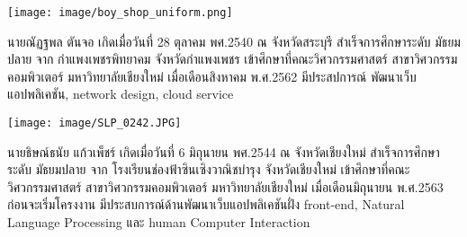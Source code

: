 \documentclass[semifinal]{cpecmu}
\author{นายณัฏฐพล ตันจอ}{Nattapon Tancho}{620610786}
\author{นายธิษณ์ธนัย แก้วเพ็ชร์}{Thidtanai Kaewphet}{630610741}
\begin{document}


\pagestyle{empty}\cleardoublepage
\normalspacing \setcounter{page}{1}  \pagestyle{cpecmu}




\ifproject


\fi



\ifproject
\normalspacing
\appendix


\ifglossary\glossarypage\fi

\ifindex\indexpage\fi

\begin{biosketch}
\begin{center}
  \texttt{[image: image/boy\_shop\_uniform.png]}
\end{center}
นายณัฏฐพล ตันจอ เกิดเมื่อวันที่ 28 ตุลาคม พศ.2540 ณ จังหวัดสระบุรี สําเร็จการศึกษาระดับ
มัธยมปลาย จาก กำแพงเพชรพิทยาคม จังหวัดกำแพงเพชร เข้าศึกษาที่คณะวิศวกรรมศาสตร์ สาขาวิศวกรรมคอมพิวเตอร์ มหาวิทยาลัยเชียงใหม่ เมื่อเดือนสิงหาคม พ.ศ.2562 มีประสปการณ์ พัฒนาเว็บแอปพลิเคชัน, network design, cloud service
\begin{center}
  \texttt{[image: image/SLP\_0242.JPG]}
\end{center}
นายธิษณ์ธนัย แก้วเพ็ชร์ เกิดเมื่อวันที่ 6 มิถุนายน พศ.2544 ณ จังหวัดเชียงใหม่ สําเร็จการศึกษาระดับ
มัธยมปลาย จาก โรงเรียนช่องฟ้าซินเซิงวาณิชบำรุง จังหวัดเชียงใหม่ เข้าศึกษาที่คณะวิศวกรรมศาสตร์ สาขาวิศวกรรมคอมพิวเตอร์ มหาวิทยาลัยเชียงใหม่ เมื่อเดือนมิถุนายน พ.ศ.2563
ก่อนจะเริ่มโครงงาน มีประสบการณ์ด้านพัฒนาเว็บแอปพลิเคชันฝั่ง front-end, Natural Language Processing และ human Computer Interaction
\end{biosketch}
\fi %
\end{document}
